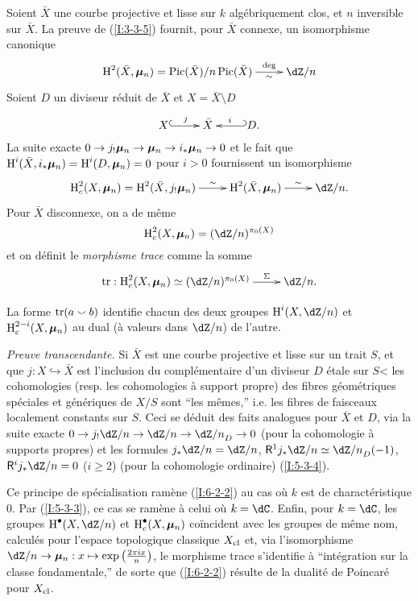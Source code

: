 \subsubsection{}\label{I:6-2-1}

Soient $\bar X$ une courbe projective et lisse sur $k$ algébriquement clos, et 
$n$ inversible sur $\bar X$. La preuve de (\ref{I:3-3-5}) fournit, pour 
$\bar X$ connexe, un isomorphisme canonique 
\[\xymatrix{
  \h^2(\bar X,\dmu_n) = \pic(\bar X)/n\pic(\bar X) \ar[r]^-{\deg}_-{\sim}
    & \dZ/n
}\]
Soient $D$ un diviseur réduit de $\bar X$ et $X=\bar X\setminus D$ 
\[\xymatrix{
  X \ar@{^{(}->}[r]^-j 
    & \bar X 
    & \ar@{_{(}->}[l]_-i D \text{.}
}\]
La suite exacte $0\to j_! {\bm\mu}_n \to {\bm\mu}_n\to i_* {\bm\mu}_n\to 0$ et le fait que 
$\operatorname{H}^i(\bar X,i_*{\bm\mu}_n) = \operatorname{H}^i(D,{\bm\mu}_n)=0$ pour $i>0$ fournissent un 
isomorphisme 
\[\xymatrix{
  \h_c^2(X,\dmu_n) = \h^2(\bar X,j_! \dmu_n) \ar[r]^-\sim 
    & \h^2(\bar X,\dmu_n) \ar[r]^-\sim 
    & \dZ/n \text{.}
}\]
Pour $\bar X$ disconnexe, on a de même 
\[
  \h_c^2(X,\dmu_n) = (\dZ/n)^{\pi_0(X)}
\]
et on définit le \emph{morphisme trace} comme la somme 
\[\xymatrix{
  \tr : \h_c^2(X,\dmu_n) \simeq (\dZ/n)^{\pi_0(X)} \ar[r]^-\Sigma
    & \dZ/n\text{.}
}\]





\begin{theorem}\label{I:6-2-2}
La forme $\operatorname{tr}(a\smallsmile b)$ identifie chacun des deux groupes $\h^i(X,\dZ/n)$ 
et $\operatorname{H}_c^{2-i}(X,{\bm\mu}_n)$ au dual (à valeurs dans $\dZ/n$) de l'autre. 
\end{theorem}

\emph{Preuve transcendante.} Si $\bar X$ est une courbe projective et lisse sur 
un trait $S$, et que $j:X\hookrightarrow \bar X$ est l'inclusion du 
complémentaire d'un diviseur $D$ étale sur $S$< les cohomologies (resp. 
les cohomologies à support propre) des fibres géométriques spéciales et 
génériques de $X/S$ sont ``les mêmes,'' i.e. les fibres de faisceaux 
localement constants sur $S$. Ceci se déduit des faits analogues pour 
$\bar X$ et $D$, via la suite exacte $0\to j_! \dZ/n\to\dZ/n\to {\dZ/n}_D\to 0$ 
(pour la cohomologie à supports propres) et les formules $j_*\dZ/n = \dZ/n$, 
$\R^1 j_* \dZ/n \simeq {\dZ/n}_D(-1)$, $\R^i j_*\dZ/n = 0$ ($i\geqslant 2$) 
(pour la cohomologie ordinaire) (\ref{I:5-3-4}). 

Ce principe de spécialisation ramène (\ref{I:6-2-2}) au cas où $k$ est de 
charactéristique $0$. Par (\ref{I:5-3-3}), ce cas se ramène à celui où 
$k=\dC$. Enfin, pour $k=\dC$, les groupes $\h^\bullet(X,\dZ/n)$ et 
$\operatorname{H}_c^\bullet(X,{\bm\mu}_n)$ coïncident avec les groupes de même nom, calculés 
pour l'espace topologique classique $X_{\textnormal{cl}}$ et, via 
l'isomorphisme $\dZ/n\to \dmu_n: x\mapsto \exp\left(\frac{2\pi i x}{n}\right)$, 
le morphisme trace s'identifie à ``intégration sur la classe fondamentale,'' 
de sorte que (\ref{I:6-2-2}) résulte de la dualité de Poincaré pour 
$X_{\textnormal{cl}}$. 





